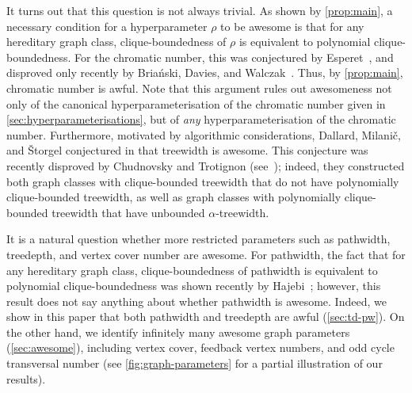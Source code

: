 \documentclass[11pt]{article}
\theoremstyle{plain}
\theoremstyle{definition}
\theoremstyle{remark}
\numberwithin{equation}{section}
\begin{document}
It turns out that this question is not always trivial.\label{discussion-awful-chi}
As shown by \cref{prop:main}, a necessary condition for a hyperparameter $\rho$ to be awesome is that for any hereditary graph class, clique-boundedness of $\rho$ is equivalent to polynomial clique-boundedness.
For the chromatic number, this was conjectured by Esperet~\cite{esperet2017graph}, and disproved only recently by Briański, Davies, and Walczak~\cite{MR4707561}.
Thus, by \cref{prop:main}, chromatic number is awful.
Note that this argument rules out awesomeness not only of the canonical hyperparameterisation of the chromatic number given in \cref{sec:hyperparameterisations}, but of \textsl{any} hyperparameterisation of the chromatic number.
Furthermore, motivated by algorithmic considerations, Dallard, Milani\v{c}, and \v{S}torgel conjectured in \cite{dallard2022secondpaper} that treewidth is awesome.
This conjecture was recently disproved by Chudnovsky and Trotignon (see~\cite{CT24}); indeed, they constructed both graph classes with clique-bounded treewidth that do not have polynomially clique-bounded treewidth, as well as graph classes with polynomially clique-bounded treewidth that have unbounded $\alpha$-treewidth.

It is a natural question whether more restricted parameters such as pathwidth, treedepth, and vertex cover number are awesome.
For pathwidth, the fact that for any hereditary graph class, clique-boundedness of pathwidth is equivalent to polynomial clique-boundedness was shown recently by Hajebi~\cite{hajebi2025polynomialboundspathwidth}; however, this result does not say anything about whether pathwidth is awesome.
Indeed, we show in this paper that both pathwidth and treedepth are awful (\cref{sec:td-pw}).
On the other hand, we identify infinitely many awesome graph parameters (\cref{sec:awesome}), including vertex cover, feedback vertex numbers, and odd cycle transversal number (see \cref{fig:graph-parameters} for a partial illustration of our results).
\end{document}
